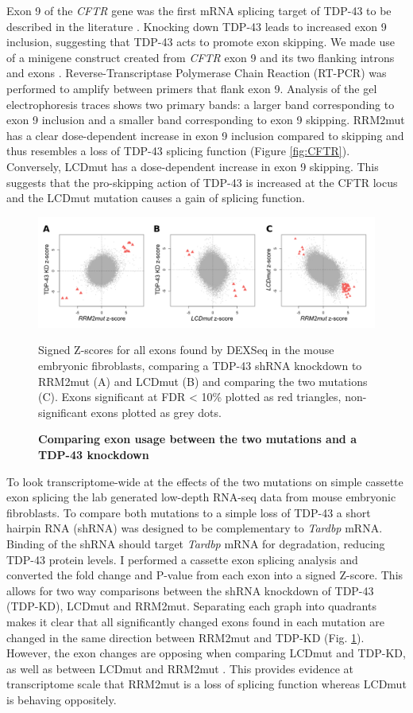 Exon 9 of the \textit{CFTR} gene was the first mRNA splicing target of TDP-43 to be described in the literature \citep{Buratti2001-et}. Knocking down TDP-43 leads to increased exon 9 inclusion, suggesting that TDP-43 acts to promote exon skipping. 
We made use of a minigene construct created from \textit{CFTR} exon 9 and its two flanking introns and exons \citep{Buratti2007minigene}.
Reverse-Transcriptase Polymerase Chain Reaction (RT-PCR) was performed to amplify between primers that flank exon 9. 
Analysis of the gel electrophoresis traces shows two primary bands: a larger band corresponding to exon 9 inclusion and a smaller band corresponding to exon 9 skipping. 
RRM2mut has a clear dose-dependent increase in exon 9 inclusion compared to skipping and thus resembles a loss of TDP-43 splicing function (Figure  \ref{fig:CFTR}). 
Conversely, LCDmut has a dose-dependent increase in exon 9 skipping.
This suggests that the pro-skipping action of TDP-43 is increased at the CFTR locus and the LCDmut mutation causes a gain of splicing function.

\begin{figure}[h]
	\centering
	\includegraphics[width=\textwidth]{Figures/05_tdp_mice/mef_scatters.png}
	\caption{\textbf{Comparing exon usage between the two mutations and a TDP-43 knockdown}}
	Signed Z-scores for all exons found by DEXSeq in the mouse embryonic fibroblasts, comparing a TDP-43 shRNA knockdown to RRM2mut (A) and LCDmut (B) and comparing the two mutations (C). Exons significant at FDR < 10\% plotted as red triangles, non-significant exons plotted as grey dots.
	\label{fig:mef_scatters}
\end{figure}

To look transcriptome-wide at the effects of the two mutations on simple cassette exon splicing the lab generated low-depth RNA-seq data from mouse embryonic fibroblasts. 
To compare both mutations to a simple loss of TDP-43 a short hairpin RNA (shRNA) was designed to be complementary to \textit{Tardbp} mRNA.
Binding of the shRNA should target \textit{Tardbp} mRNA for degradation, reducing TDP-43 protein levels. 
I performed a cassette exon splicing analysis and converted the fold change and P-value from each exon into a signed Z-score. 
This allows for two way comparisons  between the shRNA knockdown of TDP-43 (TDP-KD), LCDmut and RRM2mut. 
Separating each graph into quadrants makes it clear that all significantly changed exons found in each mutation are changed in the same direction between RRM2mut and TDP-KD (Fig. \ref{fig:mef_scatters}). 
However, the exon changes are opposing when comparing LCDmut and TDP-KD, as well as between LCDmut and RRM2mut . 
This provides evidence at transcriptome scale that RRM2mut is a loss of splicing function whereas LCDmut is behaving oppositely.

